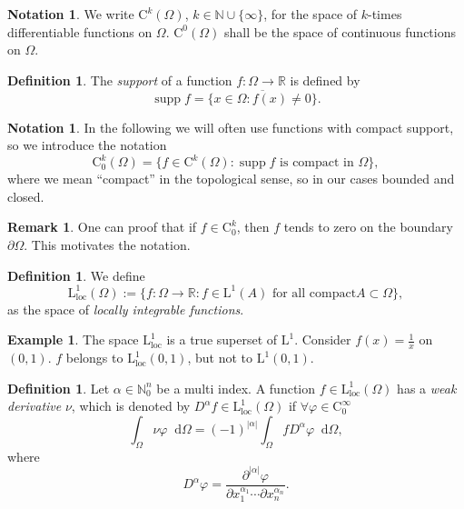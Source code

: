 \documentclass[12pt,a4paper,twoside, open=right]{scrreprt}
\theoremstyle{definition}
\newtheorem{rem}[auf]{Remark}
\newtheorem{defn}[auf]{Definition}
\newtheorem{bsp}[auf]{Example}
\newtheorem{notation}[auf]{Notation}
\theoremstyle{plain}
\DeclareMathOperator{\supp}{supp} %
\newcommand{\abs}[1]{\left\vert #1\right\vert}
\newcommand{\rr}{\mathbb{R}}
\newcommand{\nn}{\mathbb{N}}
\newcommand{\D}{\mathop{}\!\mathrm{d}}
\begin{document}
\begin{notation}
    We write $\mathrm{C}^k(\Omega)$, $k\in\nn\cup\{\infty\}$, for the space of $k$-times differentiable functions on $\Omega$. $\mathrm{C}^0(\Omega)$ shall be the space of continuous functions on $\Omega$.
\end{notation}
\begin{defn}
    The \emph{support} of a function $f\colon \Omega\to\rr$ is defined by 
    \begin{equation}
        \supp f = \overline{\{x\in\Omega\colon f(x)\neq 0\}}.
    \end{equation}
\end{defn}
\begin{notation}
    In the following we will often use functions with compact support, so we introduce the notation
    \begin{equation}
        \mathrm{C}^k_0(\Omega)=\{f\in \mathrm{C}^k(\Omega)\colon \supp f \text{ is compact in }\Omega \},
    \end{equation}
    where we mean \enquote{compact} in the topological sense, so in our cases bounded and closed.
\end{notation}
\begin{rem}
    \label{rem:testfzero}
    One can proof that if $f\in \mathrm{C}^k_0$, then $f$ tends to zero on the boundary $\partial\Omega$. This motivates the notation.
\end{rem}
\begin{defn}
    We define 
    \begin{equation}
        \mathrm{L}^1_{\mathrm{loc}}(\Omega):=\{f\colon\Omega\to\rr\colon f\in \mathrm{L}^1(A) \text{ for all compact} A\subset\Omega \},
    \end{equation}
    as the space of \emph{locally integrable functions}.
\end{defn}
\begin{bsp}
    The space $\mathrm{L}^1_\mathrm{loc}$ is a true superset of $\mathrm{L}^1$. Consider $f(x)=\frac{1}{x}$ on $(0,1)$. $f$ belongs to $\mathrm{L}^1_\mathrm{loc}(0,1)$, but not to $\mathrm{L}^1(0,1)$. 
\end{bsp}
\begin{defn}
    \label{defn:weakderivative}
    Let $\alpha\in\nn^n_0$ be a multi index. A function $f\in \mathrm{L}^1_{\mathrm{loc}}(\Omega)$ has a \emph{weak derivative} $\nu$, which is denoted by $D^\alpha f\in \mathrm{L}^1_\mathrm{loc}(\Omega)$ if $\forall \varphi\in \mathrm{C}_0^\infty$
    \begin{equation}
        \int_\Omega\nu\varphi\D\Omega = (-1)^{\abs{\alpha}}\int_\Omega fD^\alpha\varphi \D\Omega,
    \end{equation}
    where 
    \begin{equation}
        D^\alpha\varphi=\frac{\partial^{\abs{\alpha}}\varphi}{\partial x_1^{\alpha_1}\dotsb\partial x_n^{\alpha_n}}.
    \end{equation}
\end{defn}
\end{document}

